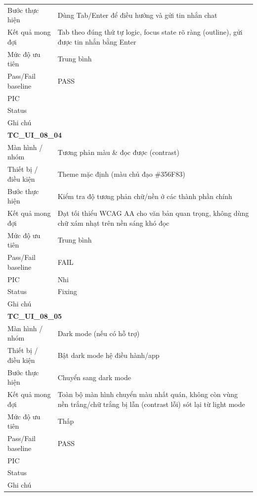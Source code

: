 \documentclass[12pt,a4paper]{article}
\begin{document}
\begin{longtable}{p{3.0cm}p{11.5cm}}
Bước thực hiện & Dùng Tab/Enter để điều hướng và gửi tin nhắn chat \\
Kết quả mong đợi & Tab theo đúng thứ tự logic, focus state rõ ràng (outline), gửi được tin nhắn bằng Enter \\
Mức độ ưu tiên & Trung bình \\
Pass/Fail baseline & PASS \\
PIC &  \\
Status &  \\
Ghi chú &  \\
\midrule
\multicolumn{2}{l}{\textbf{TC\_UI\_08\_04}} \\
Màn hình / nhóm & Tương phản màu \& đọc được (contrast) \\
Thiết bị / điều kiện & Theme mặc định (màu chủ đạo \#356F83) \\
Bước thực hiện & Kiểm tra độ tương phản chữ/nền ở các thành phần chính \\
Kết quả mong đợi & Đạt tối thiểu WCAG AA cho văn bản quan trọng, không dùng chữ xám nhạt trên nền sáng khó đọc \\
Mức độ ưu tiên & Trung bình \\
Pass/Fail baseline & FAIL \\
PIC & Nhi \\
Status & Fixing \\
Ghi chú &  \\
\midrule
\multicolumn{2}{l}{\textbf{TC\_UI\_08\_05}} \\
Màn hình / nhóm & Dark mode (nếu có hỗ trợ) \\
Thiết bị / điều kiện & Bật dark mode hệ điều hành/app \\
Bước thực hiện & Chuyển sang dark mode \\
Kết quả mong đợi & Toàn bộ màn hình chuyển màu nhất quán, không còn vùng nền trắng/chữ trắng bị lẫn (contrast lỗi) sót lại từ light mode \\
Mức độ ưu tiên & Thấp \\
Pass/Fail baseline & PASS \\
PIC &  \\
Status &  \\
Ghi chú &  \\
\midrule
\bottomrule
\end{longtable}
\end{document}
